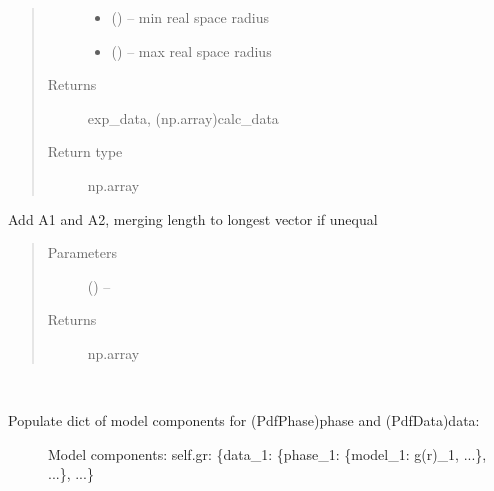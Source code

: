 \documentclass[letterpaper,10pt,english]{sphinxmanual}
\begin{document}
\begin{fulllineitems}
\begin{fulllineitems}
\begin{quote}
\begin{description}
\begin{itemize}
\item {} 
 () -- min real space radius

\item {} 
 () -- max real space radius

\end{itemize}

\item[{Returns}] \leavevmode
exp\_data, (np.array)calc\_data

\item[{Return type}] \leavevmode
np.array

\end{description}\end{quote}

\end{fulllineitems}


\begin{fulllineitems}
\label{\detokenize{rst/pairdistributionfunction:mstack.pairdistributionfunction.PdfRefinement.merge_add}}
Add A1 and A2, merging length to longest vector if unequal
\begin{quote}\begin{description}
\item[{Parameters}] \leavevmode
{} (\sphinxstyleliteralemphasis{,}\sphinxstyleliteralemphasis{}) -- 

\item[{Returns}] \leavevmode
np.array

\end{description}\end{quote}

\end{fulllineitems}


\begin{fulllineitems}
\label{\detokenize{rst/pairdistributionfunction:mstack.pairdistributionfunction.PdfRefinement.model_composite}}~\begin{description}
\item[{Populate dict of model components for (PdfPhase)phase and (PdfData)data:}] \leavevmode
Model components: self.gr: \{data\_1: \{phase\_1: \{model\_1: g(r)\_1, ...\}, ...\}, ...\}


\end{description}
\end{fulllineitems}
\end{fulllineitems}
\end{document}
